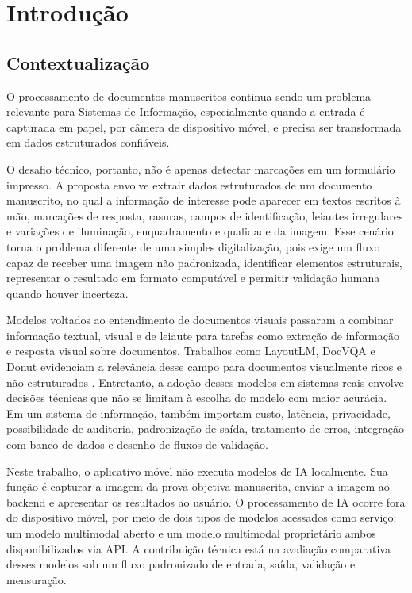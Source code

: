 \chapter[Introdução]{Introdução}

\section{Contextualização}\label{contexto}

O processamento de documentos manuscritos continua sendo um problema relevante para Sistemas de Informação, especialmente quando a entrada é capturada em papel, por câmera de dispositivo móvel, e precisa ser transformada em dados estruturados confiáveis.

O desafio técnico, portanto, não é apenas detectar marcações em um formulário impresso. A proposta envolve extrair dados estruturados de um documento manuscrito, no qual a informação de interesse pode aparecer em textos escritos à mão, marcações de resposta, rasuras, campos de identificação, leiautes irregulares e variações de iluminação, enquadramento e qualidade da imagem. Esse cenário torna o problema diferente de uma simples digitalização, pois exige um fluxo capaz de receber uma imagem não padronizada, identificar elementos estruturais, representar o resultado em formato computável e permitir validação humana quando houver incerteza.

Modelos voltados ao entendimento de documentos visuais passaram a combinar informação textual, visual e de leiaute para tarefas como extração de informação e resposta visual sobre documentos. Trabalhos como LayoutLM, DocVQA e Donut evidenciam a relevância desse campo para documentos visualmente ricos e não estruturados \cite{xu2020layoutlm,mathew2021docvqa,kim2022donut}. Entretanto, a adoção desses modelos em sistemas reais envolve decisões técnicas que não se limitam à escolha do modelo com maior acurácia. Em um sistema de informação, também importam custo, latência, privacidade, possibilidade de auditoria, padronização de saída, tratamento de erros, integração com banco de dados e desenho de fluxos de validação.

Neste trabalho, o aplicativo móvel não executa modelos de IA localmente. Sua função é capturar a imagem da prova objetiva manuscrita, enviar a imagem ao backend e apresentar os resultados ao usuário. O processamento de IA ocorre fora do dispositivo móvel, por meio de dois tipos de modelos acessados como serviço: um modelo multimodal aberto e um modelo multimodal proprietário ambos disponibilizados via API. A contribuição técnica está na avaliação comparativa desses modelos sob um fluxo padronizado de entrada, saída, validação e mensuração.

